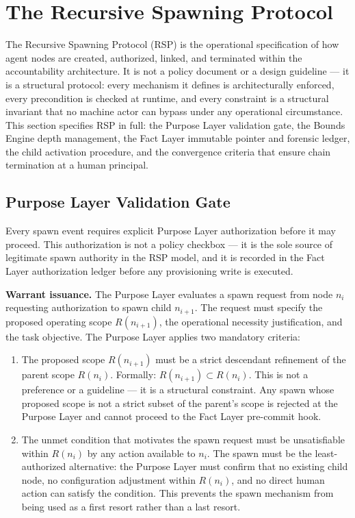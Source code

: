 \section{The Recursive Spawning Protocol}
\label{sec:rs-protocol}

The Recursive Spawning Protocol (RSP) is the operational specification of how agent nodes are created, authorized, linked, and terminated within the \bxthree{} accountability architecture. It is not a policy document or a design guideline --- it is a structural protocol: every mechanism it defines is architecturally enforced, every precondition is checked at runtime, and every constraint is a structural invariant that no machine actor can bypass under any operational circumstance. This section specifies RSP in full: the Purpose Layer validation gate, the Bounds Engine depth management, the Fact Layer immutable pointer and forensic ledger, the child activation procedure, and the convergence criteria that ensure chain termination at a human principal.

\subsection{Purpose Layer Validation Gate}
\label{sec:rsp-purpose-validation}

Every spawn event requires explicit Purpose Layer authorization before it may proceed. This authorization is not a policy checkbox --- it is the sole source of legitimate spawn authority in the RSP model, and it is recorded in the Fact Layer authorization ledger before any provisioning write is executed.

\medskip
\noindent\textbf{Warrant issuance.} The Purpose Layer evaluates a spawn request from node $n_i$ requesting authorization to spawn child $n_{i+1}$. The request must specify the proposed operating scope $R(n_{i+1})$, the operational necessity justification, and the task objective. The Purpose Layer applies two mandatory criteria:

\begin{enumerate}
    \item[(V1) \textbf{Scope refinement}] The proposed scope $R(n_{i+1})$ must be a strict descendant refinement of the parent scope $R(n_i)$. Formally: $R(n_{i+1}) \subset R(n_i)$. This is not a preference or a guideline --- it is a structural constraint. Any spawn whose proposed scope is not a strict subset of the parent's scope is rejected at the Purpose Layer and cannot proceed to the Fact Layer pre-commit hook.

    \item[(V2) \textbf{Operational necessity}] The unmet condition that motivates the spawn request must be unsatisfiable within $R(n_i)$ by any action available to $n_i$. The spawn must be the least-authorized alternative: the Purpose Layer must confirm that no existing child node, no configuration adjustment within $R(n_i)$, and no direct human action can satisfy the condition. This prevents the spawn mechanism from being used as a first resort rather than a last resort.
\end{enumerate}

